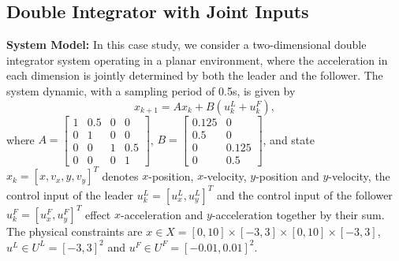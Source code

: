 \documentclass[letterpaper, 10 pt, conference]{ieeeconf}
\begin{document}
\subsection{Double Integrator with Joint Inputs}
%
{\bf System Model: }
In this case study, we consider a two-dimensional double integrator system operating in a planar environment, where the acceleration in each dimension is jointly determined by both the leader and the follower. 
The system dynamic,  with
a sampling period of 0.5s, is given by
\begin{equation}
    x_{k+1}=
    A x_{k}
    +
    B (u^L_k+u^F_k), \nonumber
\end{equation}
where $A=       \left[
                    \begin{array}{cccc}
                         1 & 0.5 & 0 & 0 \\
                         0 & 1 & 0 & 0 \\
                         0 & 0 & 1 & 0.5 \\
                         0 & 0 & 0 & 1
                    \end{array}
                \right]$,
    $B =        \left[
                    \begin{array}{cc}
                         0.125 & 0  \\
                         0.5 & 0  \\
                         0 & 0.125  \\
                         0 & 0.5 
                    \end{array}
                \right]$,
and state $x_k=[x, v_x, y, v_y]^T$ denotes $x$-position, $x$-velocity, $y$-position and $y$-velocity, the control input of the leader $u^L_k =[u^L_x, u^L_y]^T$  and the control input of the follower $u^F_k =[u^F_x, u^F_y]^T$ effect $x$-acceleration and $y$-acceleration together by their sum. The physical constraints are $x\in X = [0,10] \times [-3,3] \times [0,10] \times [-3,3]$, $u^L\in U^L = [-3,3]^2$ and $u^F\in U^F = [-0.01, 0.01]^2$.
\end{document}
